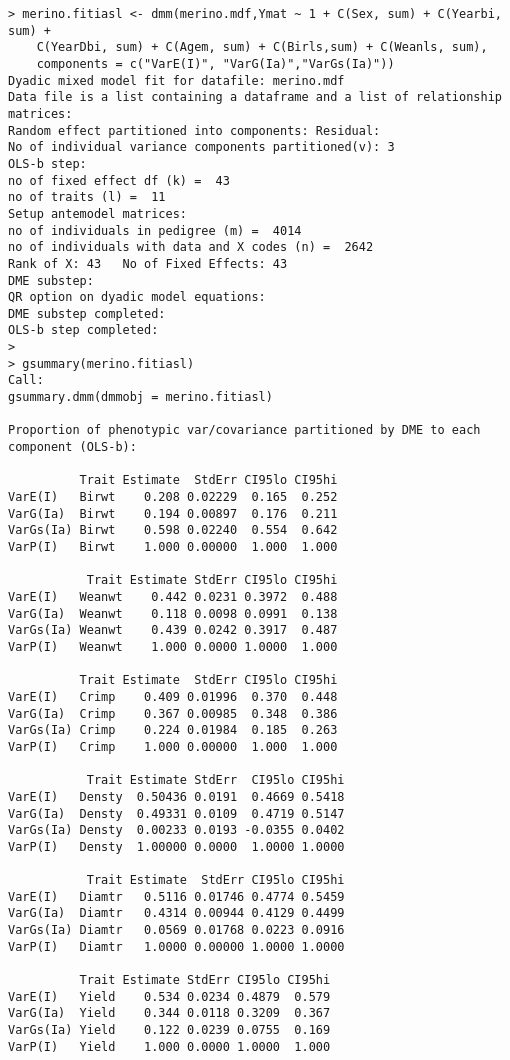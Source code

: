 \documentclass[titlepage]{article}  %
\begin{document}
\begin{verbatim}
> merino.fitiasl <- dmm(merino.mdf,Ymat ~ 1 + C(Sex, sum) + C(Yearbi, sum) +
    C(YearDbi, sum) + C(Agem, sum) + C(Birls,sum) + C(Weanls, sum),
    components = c("VarE(I)", "VarG(Ia)","VarGs(Ia)"))
Dyadic mixed model fit for datafile: merino.mdf  
Data file is a list containing a dataframe and a list of relationship matrices:
Random effect partitioned into components: Residual:
No of individual variance components partitioned(v): 3 
OLS-b step:
no of fixed effect df (k) =  43 
no of traits (l) =  11 
Setup antemodel matrices:
no of individuals in pedigree (m) =  4014 
no of individuals with data and X codes (n) =  2642 
Rank of X: 43   No of Fixed Effects: 43 
DME substep:
QR option on dyadic model equations:
DME substep completed:
OLS-b step completed:
>
> gsummary(merino.fitiasl)
Call:
gsummary.dmm(dmmobj = merino.fitiasl)

Proportion of phenotypic var/covariance partitioned by DME to each component (OLS-b):

          Trait Estimate  StdErr CI95lo CI95hi
VarE(I)   Birwt    0.208 0.02229  0.165  0.252
VarG(Ia)  Birwt    0.194 0.00897  0.176  0.211
VarGs(Ia) Birwt    0.598 0.02240  0.554  0.642
VarP(I)   Birwt    1.000 0.00000  1.000  1.000

           Trait Estimate StdErr CI95lo CI95hi
VarE(I)   Weanwt    0.442 0.0231 0.3972  0.488
VarG(Ia)  Weanwt    0.118 0.0098 0.0991  0.138
VarGs(Ia) Weanwt    0.439 0.0242 0.3917  0.487
VarP(I)   Weanwt    1.000 0.0000 1.0000  1.000

          Trait Estimate  StdErr CI95lo CI95hi
VarE(I)   Crimp    0.409 0.01996  0.370  0.448
VarG(Ia)  Crimp    0.367 0.00985  0.348  0.386
VarGs(Ia) Crimp    0.224 0.01984  0.185  0.263
VarP(I)   Crimp    1.000 0.00000  1.000  1.000

           Trait Estimate StdErr  CI95lo CI95hi
VarE(I)   Densty  0.50436 0.0191  0.4669 0.5418
VarG(Ia)  Densty  0.49331 0.0109  0.4719 0.5147
VarGs(Ia) Densty  0.00233 0.0193 -0.0355 0.0402
VarP(I)   Densty  1.00000 0.0000  1.0000 1.0000

           Trait Estimate  StdErr CI95lo CI95hi
VarE(I)   Diamtr   0.5116 0.01746 0.4774 0.5459
VarG(Ia)  Diamtr   0.4314 0.00944 0.4129 0.4499
VarGs(Ia) Diamtr   0.0569 0.01768 0.0223 0.0916
VarP(I)   Diamtr   1.0000 0.00000 1.0000 1.0000

          Trait Estimate StdErr CI95lo CI95hi
VarE(I)   Yield    0.534 0.0234 0.4879  0.579
VarG(Ia)  Yield    0.344 0.0118 0.3209  0.367
VarGs(Ia) Yield    0.122 0.0239 0.0755  0.169
VarP(I)   Yield    1.000 0.0000 1.0000  1.000


\end{verbatim}
\end{document}
